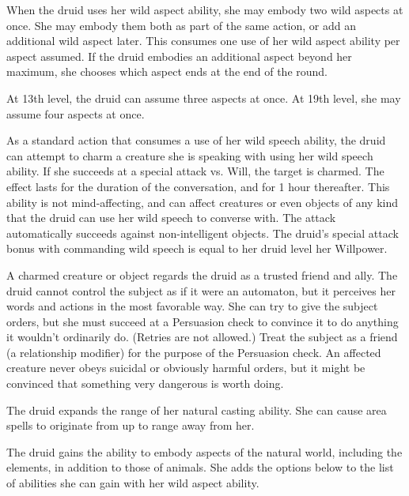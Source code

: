 When the druid uses her wild aspect ability, she may embody two wild aspects at once.
She may embody them both as part of the same action, or add an additional wild aspect later.
This consumes one use of her wild aspect ability per aspect assumed.
If the druid embodies an additional aspect beyond her maximum, she chooses which aspect ends at the end of the round.

At 13th level, the druid can assume three aspects at once. At 19th level, she may assume four aspects at once.

As a standard action that consumes a use of her wild speech ability, the druid can attempt to charm a creature she is speaking with using her wild speech ability.
If she succeeds at a special attack vs. Will, the target is charmed.
The effect lasts for the duration of the conversation, and for 1 hour thereafter.
This ability is not mind-affecting, and can affect creatures or even objects of any kind that the druid can use her wild speech to converse with.
The attack automatically succeeds against non-intelligent objects.
The druid's special attack bonus with commanding wild speech is equal to her druid level \add her Willpower.

A charmed creature or object regards the druid as a trusted friend and ally.
The druid cannot control the subject as if it were an automaton, but it perceives her words and actions in the most favorable way.
She can try to give the subject orders, but she must succeed at a Persuasion check to convince it to do anything it wouldn't ordinarily do.
(Retries are not allowed.) Treat the subject as a friend (a  relationship modifier) for the purpose of the Persuasion check.
An affected creature never obeys suicidal or obviously harmful orders, but it might be convinced that something very dangerous is worth doing.

The druid expands the range of her natural casting ability.
She can cause area spells to originate from up to \rngclose range away from her.

The druid gains the ability to embody aspects of the natural world, including the elements, in addition to those of animals.
She adds the options below to the list of abilities she can gain with her wild aspect ability.


